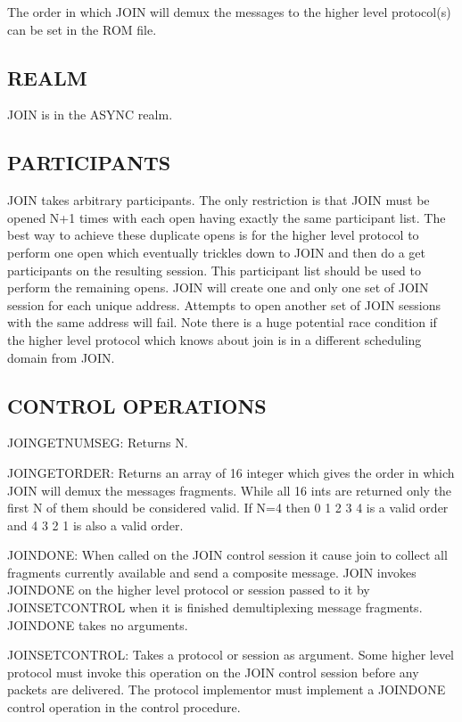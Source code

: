 The order in which JOIN will demux the messages to the higher 
level protocol(s) can be set in the ROM file.

\noindent 
\subsection*{REALM}

JOIN is in the ASYNC realm.

\subsection*{PARTICIPANTS}

JOIN takes arbitrary participants. The only restriction is that 
JOIN must be opened N+1 times with each open having exactly 
the same participant list. The best way to achieve these duplicate 
opens is for the higher level protocol to perform one open which 
eventually trickles down to JOIN and then do a get participants 
on the resulting session. This participant list should be used to 
perform the remaining opens. JOIN will create one and only one 
set of JOIN session for each unique address. Attempts to open 
another set of JOIN sessions with the same address will fail. 
Note there is a huge potential race condition if the higher level 
protocol which knows about join is in a different scheduling 
domain from JOIN. 

\subsection*{CONTROL OPERATIONS}

JOINGETNUMSEG: Returns N. 

JOINGETORDER: Returns an array of 16 integer which gives the 
order in which JOIN will demux the messages fragments.  While 
all 16 ints are returned only the first N of them should be 
considered valid. If N=4 then 0 1 2 3 4 is a valid order and 4 3 2 
1 is also a valid order. 

JOINDONE: When called on the JOIN control session it cause join 
to collect all fragments currently available and send a composite 
message. JOIN invokes JOINDONE on the higher level protocol or 
session passed to it by JOINSETCONTROL when it is finished 
demultiplexing message fragments. JOINDONE takes no arguments.

JOINSETCONTROL: Takes a protocol or session as argument. Some 
higher level protocol must invoke this operation on the JOIN 
control session before any packets are delivered. The protocol 
implementor must implement a JOINDONE control operation in 
the control procedure. 

